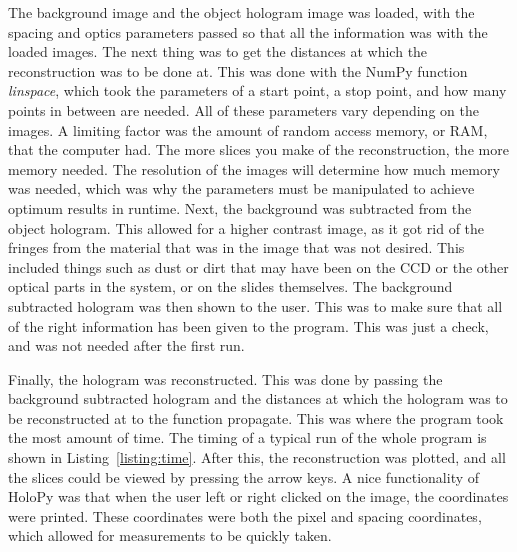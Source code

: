 The background image and the object hologram image was
loaded, with the spacing and optics parameters passed so that all the
information was with the loaded images. The next thing was to get the distances
at which the reconstruction was to be done at. This was done with the NumPy
function \emph{linspace}, which took the parameters of a start point, a stop
point, and how many points in between are needed. All of these parameters vary
depending on the images. A limiting factor was the amount of random access
memory, or RAM, that the computer had. The more slices you make of the
reconstruction, the more memory needed. The resolution of the images will
determine how much memory was needed, which was why the parameters must be
manipulated to achieve optimum results in runtime. Next, the background was
subtracted from the object hologram. This allowed for a higher contrast image,
as it got rid of the fringes from the material that was in the image that was not
desired. This included things such as dust or dirt that may have been on the
CCD or the other optical parts in the system, or on the slides themselves.
The background subtracted hologram was then shown to the user. This was to make
sure that all of the right information has been given to the program. This was
just a check, and was not needed after the first run.


Finally, the hologram was
reconstructed. This was done by passing the background subtracted hologram and
the distances at which the hologram was to be reconstructed at to the function
propagate. This was where the program took the most amount of time. The timing
of a typical run of the whole program is shown in Listing~\ref{listing:time}. After this,
the reconstruction was plotted, and all the slices could be viewed by pressing the
arrow keys. A nice functionality of HoloPy was that when the user left or right
clicked on the image, the coordinates were printed. These coordinates were both
the pixel and spacing coordinates, which allowed for measurements to be quickly taken.

















%
%


%
